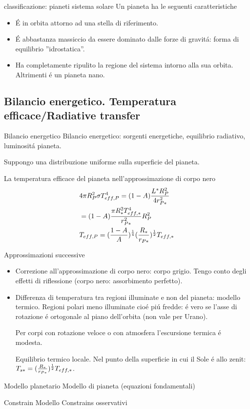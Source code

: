 \begin{wordonframe}{classificazione: pianeti sistema solare}
Un pianeta ha le seguenti caratteristiche
\begin{itemize}
    \item \'E in orbita attorno ad una stella di riferimento.
    \item \'E abbastanza massiccio da essere dominato dalle forze di gravit\'a: forma di equilibrio ''idrostatica''.
    \item Ha completamente ripulito la regione del sistema intorno alla sua orbita. Altrimenti \'e un pianeta nano.
\end{itemize}

\end{wordonframe}


\subsection{Bilancio energetico. Temperatura efficace/Radiative transfer}

\begin{frame}{Bilancio energetico}
Bilancio energetico: sorgenti energetiche, equilibrio radiativo, luminosit\'a pianeta.

Suppongo una distribuzione uniforme sulla superficie del pianeta.

La temperatura efficace del pianeta nell'approssimazione di corpo nero
\begin{align*}
&4\pi R_P^2\sigma T_{eff,P}^4=(1-A)\frac{L^*R_P^2}{4r_{P*}^2}\\
&=(1-A)\frac{\pi R_*^2T_{eff,*}^4}{r_{P*}^2}R_P^2\\
&T_{eff,P}=(\frac{1-A}{A})^{\frac{1}{4}}(\frac{R_*}{r_{P*}})^{\frac{1}{2}}T_{eff,*}
\end{align*}

Approssimazioni successive
\begin{itemize}
    \item Correzione all'approssimazione di corpo nero: corpo grigio. Tengo conto degli effetti di riflessione (corpo nero: assorbimento perfetto).
    \item Differenza di temperatura tra regioni illuminate e non del pianeta: modello termico. Regioni polari meno illuminate cio\'e pi\'u fredde: \'e vero se l'asse di rotazione \'e ortogonale al piano dell'orbita (non vale per Urano).
    
    Per corpi con rotazione veloce o con atmosfera l'escursione termica \'e modesta.
    
    Equilibrio termico locale. Nel punto della superficie in cui il Sole \'e allo zenit: $T_{s*}=(\frac{R_*}{r_{P*}})^{\frac{1}{2}}T_{eff,*}$.
\end{itemize}
\end{frame}

\begin{frame}{Modello planetario}
Modello di pianeta (equazioni fondamentali)
\end{frame}

\begin{frame}{Constrain Modello}
Constrains osservativi
\end{frame}
